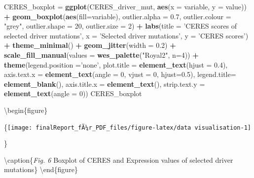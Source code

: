 \documentclass[]{article}
\newenvironment{Shaded}{\begin{snugshade}}{\end{snugshade}}
\newcommand{\DataTypeTok}[1]{\textcolor[rgb]{0.13,0.29,0.53}{#1}}
\newcommand{\DecValTok}[1]{\textcolor[rgb]{0.00,0.00,0.81}{#1}}
\newcommand{\FloatTok}[1]{\textcolor[rgb]{0.00,0.00,0.81}{#1}}
\newcommand{\KeywordTok}[1]{\textcolor[rgb]{0.13,0.29,0.53}{\textbf{#1}}}
\newcommand{\NormalTok}[1]{#1}
\newcommand{\OperatorTok}[1]{\textcolor[rgb]{0.81,0.36,0.00}{\textbf{#1}}}
\newcommand{\StringTok}[1]{\textcolor[rgb]{0.31,0.60,0.02}{#1}}
\begin{document}
\begin{Shaded}
\begin{Highlighting}[]
\NormalTok{CERES_boxplot =}\StringTok{ }\KeywordTok{ggplot}\NormalTok{(CERES_driver_mut, }\KeywordTok{aes}\NormalTok{(}\DataTypeTok{x =}\NormalTok{ variable, }\DataTypeTok{y =}\NormalTok{ value)) }\OperatorTok{+}
\StringTok{       }\KeywordTok{geom_boxplot}\NormalTok{(}\KeywordTok{aes}\NormalTok{(}\DataTypeTok{fill=}\NormalTok{variable), }\DataTypeTok{outlier.alpha =} \FloatTok{0.7}\NormalTok{,}
                     \DataTypeTok{outlier.colour =} \StringTok{"grey"}\NormalTok{, }\DataTypeTok{outlier.shape =} \DecValTok{20}\NormalTok{, }\DataTypeTok{outlier.size =} \DecValTok{2}\NormalTok{) }\OperatorTok{+}
\StringTok{        }\KeywordTok{labs}\NormalTok{(}\DataTypeTok{title =} \StringTok{'CERES scores of selected driver mutations'}\NormalTok{, }\DataTypeTok{x =} \StringTok{'Selected driver mutations'}\NormalTok{, }\DataTypeTok{y =} \StringTok{'CERES scores'}\NormalTok{) }\OperatorTok{+}
\StringTok{            }\KeywordTok{theme_minimal}\NormalTok{() }\OperatorTok{+}
\StringTok{            }\KeywordTok{geom_jitter}\NormalTok{(}\DataTypeTok{width =} \FloatTok{0.2}\NormalTok{) }\OperatorTok{+}
\StringTok{            }\KeywordTok{scale_fill_manual}\NormalTok{(}\DataTypeTok{values =} \KeywordTok{wes_palette}\NormalTok{(}\StringTok{"Royal2"}\NormalTok{, }\DataTypeTok{n=}\DecValTok{4}\NormalTok{)) }\OperatorTok{+}
\StringTok{            }\KeywordTok{theme}\NormalTok{(}\DataTypeTok{legend.position =}\StringTok{'none'}\NormalTok{,}
                  \DataTypeTok{plot.title =} \KeywordTok{element_text}\NormalTok{(}\DataTypeTok{hjust =} \FloatTok{0.4}\NormalTok{),}
                  \DataTypeTok{axis.text.x =} \KeywordTok{element_text}\NormalTok{(}\DataTypeTok{angle =} \DecValTok{0}\NormalTok{, }\DataTypeTok{vjust =} \DecValTok{0}\NormalTok{, }\DataTypeTok{hjust=}\FloatTok{0.5}\NormalTok{),}
                  \DataTypeTok{legend.title=} \KeywordTok{element_blank}\NormalTok{(),}
                  \DataTypeTok{axis.title.x =} \KeywordTok{element_text}\NormalTok{(),}
                  \DataTypeTok{strip.text.y =} \KeywordTok{element_text}\NormalTok{(}\DataTypeTok{angle =} \DecValTok{0}\NormalTok{))}
\NormalTok{CERES_boxplot}
\end{Highlighting}
\end{Shaded}

\textbackslash begin\{figure\}

\{\centering \texttt{[image: finalReport\_fÃ¼r\_PDF\_files/figure-latex/data visualisation-1]}

\}

\textbackslash caption\{\emph{Fig. 6} Boxplot of CERES and Expression
values of selected driver mutations\}\label{fig:data visualisation1}
\textbackslash end\{figure\}
\end{document}
